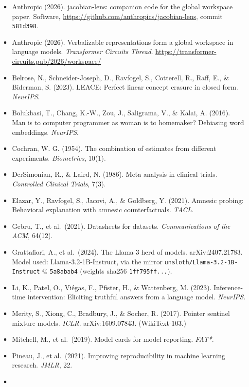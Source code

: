 \documentclass[
  10pt,
]{article}
\providecommand{\tightlist}{%
  \setlength{\itemsep}{0pt}\setlength{\parskip}{0pt}}
\begin{document}
\begin{itemize}
\tightlist
\item
  Anthropic (2026). jacobian-lens: companion code for the global
  workspace paper. Software,
  \url{https://github.com/anthropics/jacobian-lens}, commit
  \texttt{581d398}.
\item
  Anthropic (2026). Verbalizable representations form a global workspace
  in language models. \emph{Transformer Circuits Thread}.
  \url{https://transformer-circuits.pub/2026/workspace/}
\item
  Belrose, N., Schneider-Joseph, D., Ravfogel, S., Cotterell, R., Raff,
  E., \& Biderman, S. (2023). LEACE: Perfect linear concept erasure in
  closed form. \emph{NeurIPS}.
\item
  Bolukbasi, T., Chang, K.-W., Zou, J., Saligrama, V., \& Kalai, A.
  (2016). Man is to computer programmer as woman is to homemaker?
  Debiasing word embeddings. \emph{NeurIPS}.
\item
  Cochran, W. G. (1954). The combination of estimates from different
  experiments. \emph{Biometrics}, 10(1).
\item
  DerSimonian, R., \& Laird, N. (1986). Meta-analysis in clinical
  trials. \emph{Controlled Clinical Trials}, 7(3).
\item
  Elazar, Y., Ravfogel, S., Jacovi, A., \& Goldberg, Y. (2021). Amnesic
  probing: Behavioral explanation with amnesic counterfactuals.
  \emph{TACL}.
\item
  Gebru, T., et al.~(2021). Datasheets for datasets.
  \emph{Communications of the ACM}, 64(12).
\item
  Grattafiori, A., et al.~(2024). The Llama 3 herd of models.
  arXiv:2407.21783. Model used: Llama-3.2-1B-Instruct, via the mirror
  \texttt{unsloth/Llama-3.2-1B-Instruct} @ \texttt{5a8abab4} (weights
  sha256 \texttt{1ff795ff...}).
\item
  Li, K., Patel, O., Viégas, F., Pfister, H., \& Wattenberg, M. (2023).
  Inference-time intervention: Eliciting truthful answers from a
  language model. \emph{NeurIPS}.
\item
  Merity, S., Xiong, C., Bradbury, J., \& Socher, R. (2017). Pointer
  sentinel mixture models. \emph{ICLR}. arXiv:1609.07843.
  (WikiText-103.)
\item
  Mitchell, M., et al.~(2019). Model cards for model reporting.
  \emph{FAT*}.
\item
  Pineau, J., et al.~(2021). Improving reproducibility in machine
  learning research. \emph{JMLR}, 22.
\item

\end{itemize}
\end{document}
